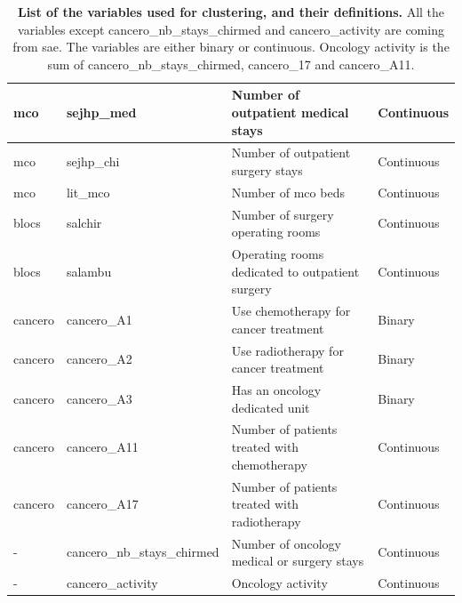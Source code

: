 \begin{table}[H]
{\begin{tabular}{|l|l|l|l|}
            \acs{mco}                & sejhp\_med                  & Number of outpatient medical stays              & Continuous            \\ \hline
            \acs{mco}                & sejhp\_chi                  & Number of outpatient surgery stays              & Continuous            \\ \hline
            \acs{mco}                & lit\_mco                    & Number of \acs{mco} beds                        & Continuous            \\ \hline
            blocs                    & salchir                     & Number of surgery operating rooms               & Continuous            \\ \hline
            blocs                    & salambu                     & Operating rooms dedicated to outpatient surgery & Continuous            \\ \hline
            cancero                  & cancero\_A1                 & Use chemotherapy for cancer treatment           & Binary                \\ \hline
            cancero                  & cancero\_A2                 & Use radiotherapy for cancer treatment           & Binary                \\ \hline
            cancero                  & cancero\_A3                 & Has an oncology dedicated unit                  & Binary                \\ \hline
            cancero                  & cancero\_A11                & Number of patients treated with chemotherapy    & Continuous            \\ \hline
            cancero                  & cancero\_A17                & Number of patients treated with radiotherapy    & Continuous            \\ \hline
            -                        & cancero\_nb\_stays\_chirmed & Number of oncology medical or surgery stays     & Continuous            \\ \hline
            -                        & cancero\_activity           & Oncology activity                               & Continuous            \\ \hline
        \end{tabular}}
    \caption{
        \textbf{List of the variables used for clustering, and their definitions.}
        All the variables except
        cancero\_nb\_stays\_chirmed and cancero\_activity are coming from \ac{sae}.
        The variables are either binary or continuous. Oncology activity is the sum
        of cancero\_nb\_stays\_chirmed, cancero\_17 and cancero\_A11.
    }
    \label{table:sae-variables}
\end{table}

